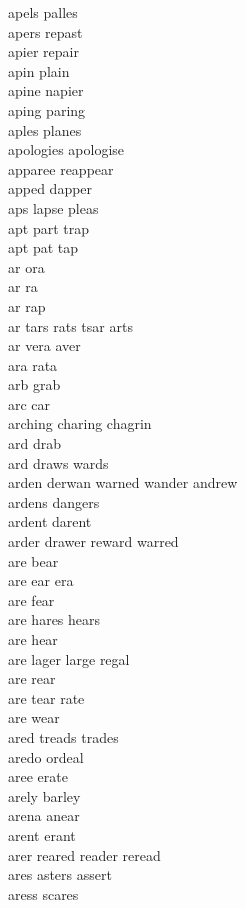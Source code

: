 apels palles \\
apers repast \\
apier repair \\
apin plain \\
apine napier \\
aping paring \\
aples planes \\
apologies apologise\\
apparee reappear \\
apped dapper \\
aps lapse pleas  \\
apt part trap \\
apt pat tap\\
ar ora \\
ar ra\\
ar rap \\
ar tars rats tsar arts  \\
ar vera aver  \\
ara rata \\
arb grab \\
arc car\\
arching charing chagrin\\
ard drab \\
ard draws wards  \\
arden derwan warned wander andrew \\
ardens dangers \\
ardent darent\\
arder drawer reward warred \\
are bear \\
are ear era\\
are fear \\
are hares hears  \\
are hear \\
are lager large regal  \\
are rear \\
are tear rate \\
are wear \\
ared treads trades  \\
aredo ordeal \\
aree erate \\
arely barley \\
arena anear\\
arent erant\\
arer reared reader reread  \\
ares asters assert  \\
aress scares \\
